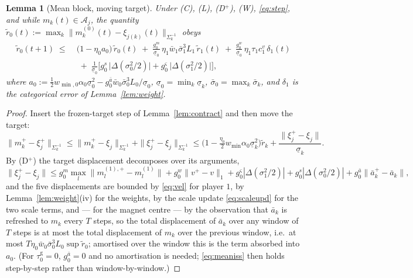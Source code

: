 \documentclass[11pt]{article}
\newtheorem{lemma}{Lemma}
\theoremstyle{definition}
\newcommand{\cA}{\mathcal{A}}
\begin{document}
\begin{lemma}[Mean block, moving target]\label{lem:mean}
Under (C), (L), (D$^+$), (W), \eqref{eq:step}, and while $m_k(t) \in \cA_j$, the
quantity $\tilde r_0(t) := \max_k \|m^{(0)}_k(t) - \xi_{j(k)}(t)\|_{\Sigma_k^{-1}}$
obeys
\begin{align}
  \tilde r_0(t+1) \;\le\;& \big(1 - \eta_0 a_0\big)\, \tilde r_0(t)
  \;+\; \frac{g^m_0}{\underline\sigma_0}\, \eta_1 \bar w_1\bar\sigma_1^3 L_1\,
        \tilde r_1(t)
  \;+\; \frac{g^w_0}{\underline\sigma_0}\, \eta_1 \tau_1 c^v_1\, \delta_1(t)
  \nonumber\\
  &\;+\; \frac{1}{\underline\sigma_0}\Big[
        g^s_0\,\big|\Delta (\sigma_0^2/2)\big|
      + g^\varsigma_0\,\big|\Delta (\sigma_1^2/2)\big| \Big],
  \label{eq:meaniss}
\end{align}
where $a_0 := \tfrac12 w_{\min,0}\alpha_0\underline\sigma_0^2
- g^{\bar a}_0\bar w_0\bar\sigma_0^3 L_0 / \underline\sigma_0$, $\underline\sigma_0
= \min_k \underline\sigma_k$, $\bar\sigma_0 = \max_k\bar\sigma_k$, and $\delta_1$
is the categorical error of Lemma~\ref{lem:weight}.
\end{lemma}

\begin{proof}
Insert the frozen-target step of Lemma~\ref{lem:contract} and then move the
target:
\[
  \|m^+_k - \xi^+_j\|_{\Sigma_k^{-1}}
  \le \|m^+_k - \xi_j\|_{\Sigma_k^{-1}}
    + \|\xi^+_j - \xi_j\|_{\Sigma_k^{-1}}
  \le \big(1 - \tfrac{\eta_0}{2} w_{\min}\alpha_0\underline\sigma_k^2\big)\tilde r_k
    + \frac{\|\xi^+_j - \xi_j\|}{\underline\sigma_k}.
\]
By (D$^+$) the target displacement decomposes over its arguments,
\[
  \|\xi^+_j - \xi_j\| \le g^m_0 \max_l \|m^{(1),+}_l - m^{(1)}_l\|
   + g^w_0 \|v^+ - v\|_1
   + g^\varsigma_0 |\Delta(\sigma_1^2/2)|
   + g^s_0 |\Delta(\sigma_0^2/2)|
   + g^{\bar a}_0 \|\bar a^+_k - \bar a_k\| ,
\]
and the five displacements are bounded by \eqref{eq:vel} for player $1$, by
Lemma~\ref{lem:weight}(iv) for the weights, by the scale update
\eqref{eq:scaleupd} for the two scale terms, and --- for the magnet centre --- by
the observation that $\bar a_k$ is refreshed to $m_k$ every $T$ steps, so the
total displacement of $\bar a_k$ over any window of $T$ steps is at most the total
displacement of $m_k$ over the previous window, i.e.\ at most
$T\eta_0 \bar w_0 \bar\sigma_0^3 L_0 \sup \tilde r_0$; amortised over the window
this is the term absorbed into $a_0$. (For $\tau^{\mathrm g}_0 = 0$,
$g^{\bar a}_0 = 0$ and no amortisation is needed; \eqref{eq:meaniss} then holds
step-by-step rather than window-by-window.)
\end{proof}
\end{document}
